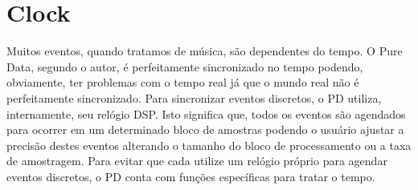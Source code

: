 \chapter{Clock}

Muitos eventos, quando tratamos de música, são dependentes do tempo.
O Pure Data, segundo o autor, é perfeitamente sincronizado no tempo podendo,
obviamente, ter problemas com o tempo real já que o mundo real não é perfeitamente
sincronizado.
Para sincronizar eventos discretos, o PD utiliza, internamente, seu relógio DSP.
Isto significa que, todos os eventos são agendados para ocorrer em um determinado
bloco de amostras podendo o usuário ajustar a precisão destes eventos alterando
o tamanho do bloco de processamento ou a taxa de amostragem.
Para evitar que cada \external utilize um relógio próprio para agendar eventos
discretos, o PD conta com funções específicas para tratar o tempo.



